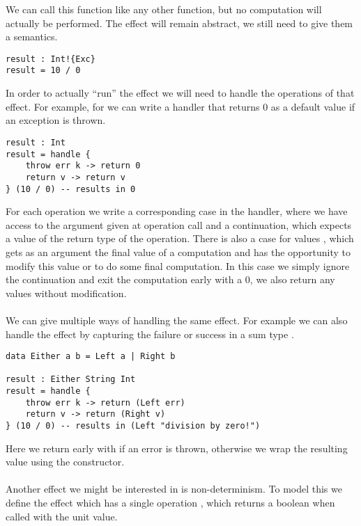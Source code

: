 {We can call this function like any other function, but no computation will actually be performed.
The effect will remain abstract, we still need to give them a semantics.

\begin{verbatim}
result : Int!{Exc}
result = 10 / 0
\end{verbatim}

In order to actually ``run'' the effect we will need to handle the operations of that effect.
For example, for  we can write a handler that returns $0$ as a default value if an exception is thrown.

\begin{verbatim}
result : Int
result = handle {
	throw err k -> return 0
	return v -> return v
} (10 / 0) -- results in 0
\end{verbatim}

For each operation we write a corresponding case in the handler, where we have access to the argument given at operation call and a continuation, which expects a value of the return type of the operation.
There is also a case for values , which gets as an argument the final value of a computation and has the opportunity to modify this value or to do some final computation.
In this case we simply ignore the continuation and exit the computation early with a $0$, we also return any values without modification.
\\\\
We can give multiple ways of handling the same effect.
For example we can also handle the  effect by capturing the failure or success in a sum type .

\begin{verbatim}
data Either a b = Left a | Right b

result : Either String Int
result = handle {
	throw err k -> return (Left err)
	return v -> return (Right v)
} (10 / 0) -- results in (Left "division by zero!")
\end{verbatim}

Here we return early with  if an error is thrown, otherwise we wrap the resulting value using the  constructor.
\\\\
Another effect we might be interested in is non-determinism.
To model this we define the  effect which has a single operation , which returns a boolean when called with the unit value.

}
